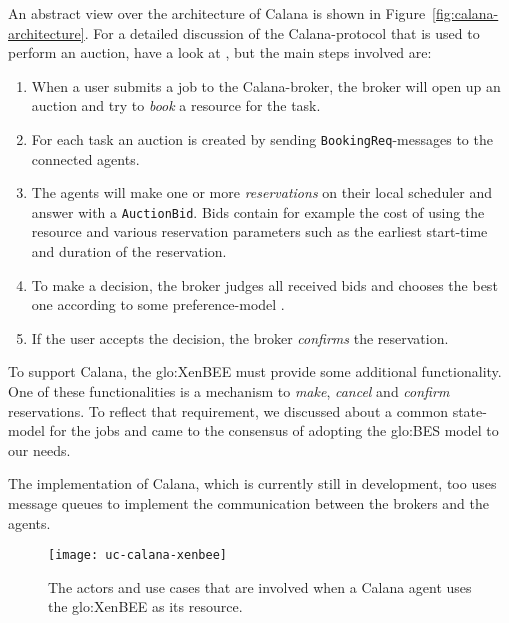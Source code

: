 An  abstract   view  over   the  architecture  of   Calana  is   shown  in
Figure~\ref{fig:calana-architecture}.   For a  detailed discussion  of the
Calana-protocol  that  is used  to  perform an  auction,  have  a look  at
\cite{dalheimer06calanaprotocol,petry06}, but  the  main steps  involved
are:
\begin{enumerate}
\item When a user submits a job to the Calana-broker, the broker will open
  up an auction and try to \emph{book} a resource for the task.
\item    For   each   task    an   auction    is   created    by   sending
  \texttt{BookingReq}-messages to the connected agents.
\item The agents will make  one or more \emph{reservations} on their local
  scheduler  and  answer with  a  \texttt{AuctionBid}.   Bids contain  for
  example  the  cost  of   using  the  resource  and  various  reservation
  parameters  such  as  the   earliest  start-time  and  duration  of  the
  reservation.
\item To make a decision, the  broker judges all received bids and chooses
  the     best     one      according     to     some     preference-model
  \cite{dalheimer05agentbased, petry06}.
\item If  the user  accepts the decision,  the broker  \emph{confirms} the
  reservation.
\end{enumerate}

To  support  Calana, the  \gls{glo:XenBEE}  must  provide some  additional
functionality. One of these functionalities is a mechanism to \emph{make},
\emph{cancel}   and   \emph{confirm}   reservations.   To   reflect   that
requirement, we discussed about a common state-model for the jobs and came
to the consensus of adopting the \gls{glo:BES} model to our needs.

The implementation of Calana, which is currently still in development, too
uses message queues to implement the communication between the brokers and
the agents.

\begin{figure}[htbp]
  \begin{center}
    \texttt{[image: uc-calana-xenbee]}
  \end{center}
  \caption[Calana and  XenBEE]{The actors and use cases  that are involved
    when a Calana agent uses the \gls{glo:XenBEE} as its resource.}
  \label{fig:calana-xenbee}
\end{figure}

